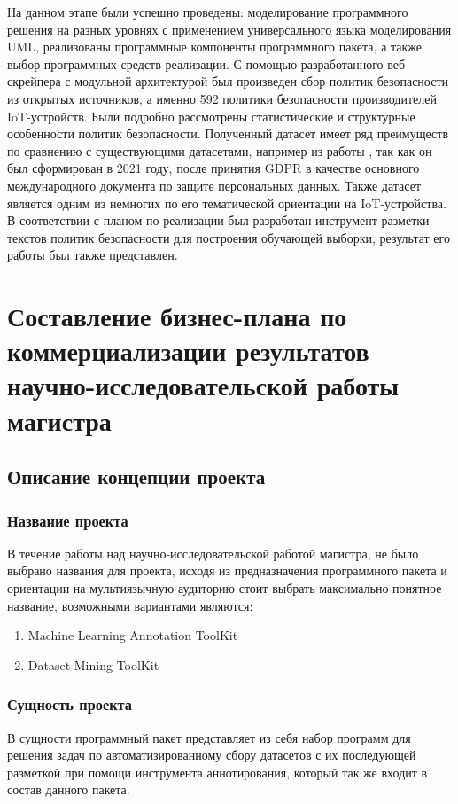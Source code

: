 \documentclass[../main]{subfiles}
\begin{document}
На данном этапе были успешно проведены: моделирование программного решения на разных уровнях с применением универсального языка моделирования UML, реализованы программные компоненты программного пакета, а также выбор программных средств реализации. С помощью разработанного веб-скрейпера с модульной архитектурой был произведен сбор политик безопасности из открытых источников, а именно 592 политики безопасности производителей IoT-устройств. Были подробно рассмотрены статистические и структурные особенности политик безопасности. Полученный датасет имеет ряд преимуществ по сравнению с существующими датасетами, например из работы \cite{MDPI18}, так как он был сформирован в 2021 году, после принятия GDPR в качестве основного международного документа по защите персональных данных. Также датасет является одним из немногих по его тематической ориентации на IoT-устройства. В соответствии с планом по реализации был разработан инструмент разметки текстов политик безопасности для построения обучающей выборки, результат его работы был также представлен.

\newpage
\section{Составление бизнес-плана по коммерциализации результатов научно-исследовательской работы магистра}

\subsection{Описание концепции проекта}
\subsubsection{Название проекта}
В течение работы над научно-исследовательской работой магистра, не было выбрано названия для проекта, исходя из предназначения программного пакета и ориентации на мультиязычную аудиторию стоит выбрать максимально понятное название, возможными вариантами являются:
\begin{enumerate}
    \item Machine Learning Annotation ToolKit
    \item Dataset Mining ToolKit
\end{enumerate}

\subsubsection{Сущность проекта}
В сущности программный пакет представляет из себя набор программ для решения задач по автоматизированному сбору датасетов с их последующей разметкой при помощи инструмента аннотирования, который так же входит в состав данного пакета.
\end{document}
